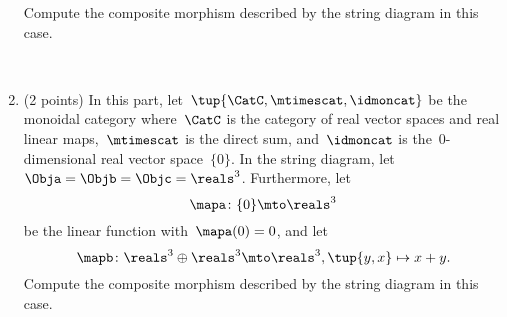 \documentclass[paper=8.125in:10.250in,pagesize=pdftex,
    headinclude=false,footinclude=false,oneside,egregdoesnotlikesansseriftitles]{kaobook}
\begin{document}
\begin{gradedexercise}
\begin{enumerate}
Compute the composite morphism described by the string diagram in this case.

\

\item (2 points) In this part, let~$\tup{\CatC,\mtimescat,\idmoncat}$ be the monoidal category where~$\CatC$ is the category of real vector spaces and real linear maps,~$\mtimescat$ is the direct sum, and~$\idmoncat$ is the~$0$-dimensional real vector space~$\{ 0 \}$.
In the string diagram, let~$\Obja = \Objb = \Objc = \reals^3$.
Furthermore, let~
$$\mapa\colon \{ 0 \} \mto \reals^3$$ 
be the linear function with~$\mapa(0) = 0$, and let~
$$\mapb \colon \reals^3 \oplus \reals^3 \mto \reals^3, \tup{y, x} \mapsto x + y.$$
Compute the composite morphism described by the string diagram in this case.

%

\end{enumerate}
\end{gradedexercise}


\newpage
\end{document}
